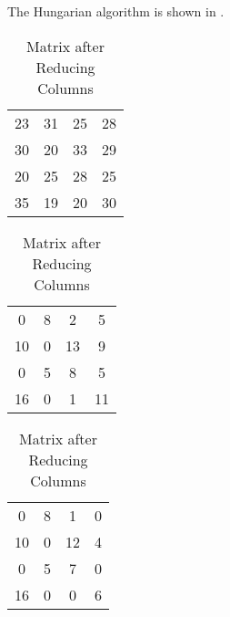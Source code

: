 \begin{subquestions}
\begin{subsubquestions}
The Hungarian algorithm is shown in .
\begin{table}[!hbt]
	\begin{minipage}{0.3\textwidth}
		\centering
		\begin{tabular}{cccc}
			23 & 31 & 25 & 28 \\
			30 & 20 & 33 & 29 \\
			20 & 25 & 28 & 25 \\
			35 & 19 & 20 & 30 \\
		\end{tabular}
		\captionsetup{width=1.1\linewidth}
		\caption*{Matrix From question}
	\end{minipage}
	\hspace{20pt}
	\begin{minipage}{0.3\textwidth}
		\centering
		\begin{tabular}{cccc}
			0 & 8 & 2 & 5 \\
		   10 & 0 & 13 & 9 \\
			0 & 5 & 8 & 5 \\
		   16 & 0 & 1 & 11 \\
		\end{tabular}
		\captionsetup{width=1.1\linewidth}
		\caption*{Matrix after Reducing Rows}
	\end{minipage}
	\hspace{20pt}
	\begin{minipage}{0.3\textwidth}
		\centering
		\begin{tabular}{cccc}
			0 & 8 & 1 & 0 \\
		   10 & 0 & 12 & 4 \\
			0 & 5 & 7 & 0 \\
		   16 & 0 & 0 & 6 \\
		\end{tabular}
		\captionsetup{width=1.1\linewidth}
		\caption*{Matrix after Reducing Columns} 
	\end{minipage}
	

\end{table}
\end{subsubquestions}
\end{subquestions}
